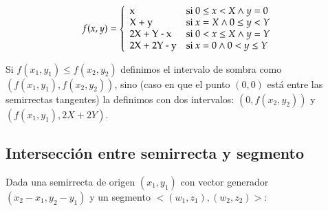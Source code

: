 \begin{itemize}
\vspace{0.2cm}
\begin{center}
\[ f(x, y) = \left\{
               \begin{array}{llll}
				 $x$ & \mbox{si $0 \le x < X \wedge y = 0$} \\
				 $X + y$ & \mbox{si $x = X \wedge 0 \le y < Y$} \\
				 $2X + Y - x$ & \mbox{si $0 < x \le X \wedge y = Y$} \\
				 $2X + 2Y - y$ & \mbox{si $x = 0 \wedge 0 < y \le Y$}
			   \end{array}
			 \right.
\]
\end{center}
\vspace{0.2cm}

\end{itemize}

Si $f(x_1,y_1) \le f(x_2,y_2)$ definimos el intervalo de sombra como
$(f(x_1,y_1), f(x_2,y_2))$, sino (caso en que el punto $(0,0)$ está entre las
semirrectas tangentes) la definimos con dos intervalos: $(0, f(x_2,y_2))$ y
$(f(x_1,y_1), 2X + 2Y)$.


\subsection*{Intersección entre semirrecta y segmento}

Dada una semirrecta de origen $(x_1, y_1)$ con vector generador $(x_2-x_1, y_2-y_1)$ y un
segmento $<(w_1, z_1), (w_2, z_2)>$:

